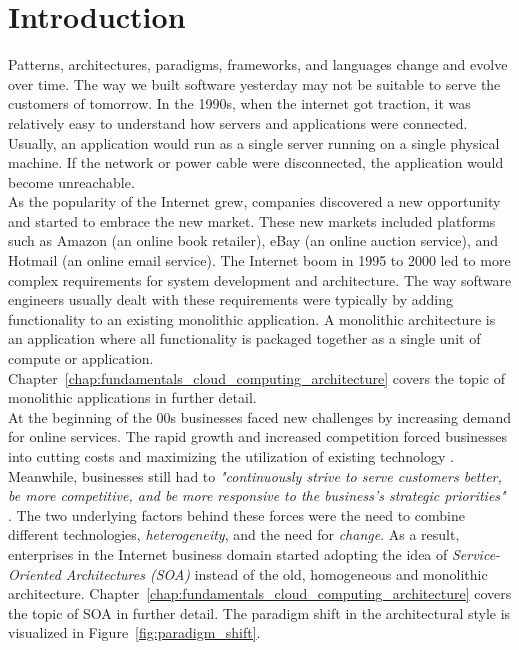 \chapter{Introduction}
\label{chapter1_introduction}


Patterns, architectures, paradigms, frameworks, and languages change and evolve over time. The way we built software yesterday may not be suitable to serve the customers of tomorrow. In the 1990s, when the internet got traction, it was relatively easy to understand how servers and applications were connected. Usually, an application would run as a single server running on a single physical machine. If the network or power cable were disconnected, the application would become unreachable. \\

\noindent
As the popularity of the Internet grew, companies discovered a new opportunity and started to embrace the new market. These new markets included platforms such as Amazon (an online book retailer), eBay (an online auction service), and Hotmail (an online email service). The Internet boom in 1995 to 2000 led to more complex requirements for system development and architecture. The way software engineers usually dealt with these requirements were typically by adding functionality to an existing monolithic application. A monolithic architecture is an application where all functionality is packaged together as a single unit of compute or application. Chapter~\ref{chap:fundamentals_cloud_computing_architecture} covers the topic of monolithic applications in further detail. \\

\noindent
At the beginning of the 00s businesses faced new challenges by increasing demand for online services. The rapid growth and increased competition forced businesses into cutting costs and maximizing the utilization of existing technology \cite[p. 18]{endrei2004patterns}. Meanwhile, businesses still had to \textit{"continuously strive to serve customers better, be more competitive, and be more responsive to the business’s strategic priorities"} \cite[p. 18]{endrei2004patterns}. The two underlying factors behind these forces were the need to combine different technologies, \textit{heterogeneity}, and the need for \textit{change}. As a result, enterprises in the Internet business domain started adopting the idea of \textit{Service-Oriented Architectures (SOA)} instead of the old, homogeneous and monolithic architecture. Chapter~\ref{chap:fundamentals_cloud_computing_architecture} covers the topic of SOA in further detail. The paradigm shift in the architectural style is visualized in Figure~\ref{fig:paradigm_shift}.

